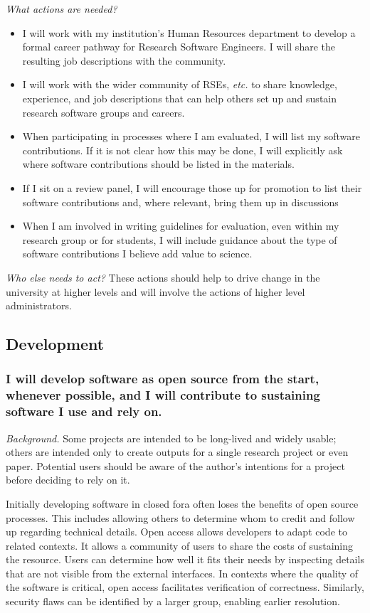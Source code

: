 \documentclass[a4paper,UKenglish]{dagman}
\renewcommand{\paragraph}[1]{\subsubsection*{#1}\xspace}
\newcommand{\etc}{\emph{etc.}\xspace}
\begin{document}
\emph{What actions are needed?}
\begin{itemize}
\item I will work with my institution's Human Resources department to develop a formal career pathway for Research Software Engineers. I will share the resulting job descriptions with the community.
\item I will work with the wider community of RSEs, \etc to share knowledge, experience, and job descriptions that can help others set up and sustain research software groups and careers.
\item When participating in processes where I am evaluated, I will list my software contributions.
If it is not clear how this may be done, I will explicitly ask where software contributions should be listed in the materials.
\item If I sit on a review panel, I will encourage those up for promotion to list their software contributions and, where relevant, bring them up in discussions
\item When I am involved in writing guidelines for evaluation, even within my research group or for students, I will include guidance about the type of software contributions I believe add value to science. 
\end{itemize}

\emph{Who else needs to act?}
These actions should help to drive change in the university at higher levels and will involve the actions of higher level administrators.

\subsection*{Development}

\paragraph{I will develop software as open source from the start, whenever possible, and I will contribute to sustaining software I use and rely on.}

\emph{Background.}
Some projects are intended to be long-lived and widely usable; others are intended only to create outputs for a single research project or even paper. Potential users should be aware of the author's intentions for a project before deciding to rely on it.  

Initially developing software in closed fora often loses the benefits of open source processes. This includes allowing others to determine whom to credit and follow up regarding technical details. Open access allows developers to adapt code to related contexts. It allows a community of users to share the costs of sustaining the resource. Users can determine how well it fits their needs by inspecting details that are not visible from the external interfaces. In contexts where the quality of the software is critical, open access facilitates verification of correctness. Similarly, security flaws can be identified by a larger group, enabling earlier resolution.
\end{document}
